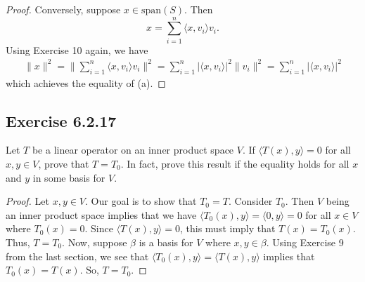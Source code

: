 \begin{enumerate}
\begin{proof}
        Conversely, suppose \( x \in \text{span}(S) \). Then
        \[  x = \sum_{ i=1  }^{ n  } \langle x , {v}_{i} \rangle {v}_{i}.  \]
        Using Exercise 10 again, we have
        \begin{align*}
            \|x\|^{2} = \Big\| \sum_{ i=1  }^{ n  } \langle x , {v}_{i} \rangle {v}_{i} \Big\|^{2} = \sum_{ i=1  }^{ n } | \langle x , {v}_{i} \rangle |^{2} \|{v}_{i}\|^{2} = \sum_{ i=1  }^{ n  } | \langle x , {v}_{i} \rangle |^{2} 
        \end{align*}
        which achieves the equality of (a).
        \end{proof}
\end{enumerate}

\subsection*{Exercise 6.2.17} Let \( T  \) be a linear operator on an inner product space \( V  \). If \( \langle T(x) , y \rangle = 0  \) for all \( x,y \in V  \), prove that \( T = {T}_{0} \). In fact, prove this result if the equality holds for all \( x  \) and \( y  \) in some basis for \( V  \).
\begin{proof}
Let \( x,y \in V  \). Our goal is to show that \( {T}_{0} = T \). Consider \( {T}_{0}  \). Then \( V  \) being an inner product space implies that we have \( \langle {T}_{0}(x) , y \rangle = \langle 0 , y \rangle = 0  \) for all \( x \in V  \) where \( {T}_{0}(x) = 0  \). Since \( \langle T(x) , y \rangle = 0  \), this must imply that \( T(x) = {T}_{0}(x)   \). Thus, \( T = {T}_{0} \). Now, suppose \( \beta  \) is a basis for \( V  \) where \( x,y \in \beta \). Using Exercise 9 from the last section, we see that \( \langle {T}_{0}(x) , y \rangle = \langle T(x) , y \rangle  \) implies that \( {T}_{0}(x) = T(x) \). So, \( T = {T}_{0} \).
\end{proof}

